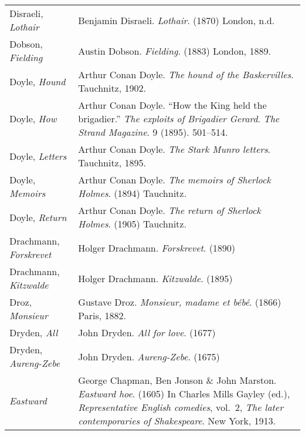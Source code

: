 \begin{longtable}{p{} p{}}
Disraeli, \textit{Lothair} & Benjamin Disraeli. \textit{Lothair}. (1870) London, n.d. \\ %

Dobson, \textit{Fielding} & Austin Dobson. \textit{Fielding}. (1883) London, 1889.  \\ %

Doyle, \textit{Hound} & Arthur Conan Doyle. \textit{The hound of the Baskervilles}. Tauchnitz, 1902. \\
Doyle, \textit{How} & Arthur Conan Doyle. ``How the King held the brigadier.'' \textit{The exploits of Brigadier Gerard}.  \textit{The Strand Magazine}. 9 (1895). 501--514. \\ %
Doyle, \textit{Letters} & Arthur Conan Doyle. \textit{The Stark Munro letters}. Tauchnitz, 1895.  \\
Doyle, \textit{Memoirs} & Arthur Conan Doyle. \textit{The memoirs of Sherlock Holmes}. (1894) Tauchnitz. \\ %
Doyle, \textit{Return} & Arthur Conan Doyle. \textit{The return of Sherlock Holmes}. (1905) Tauchnitz. \\ %

Drachmann, \textit{Forskrevet} & Holger Drachmann. \textit{Forskrevet}. (1890) \\
Drachmann, \textit{Kitzwalde} & Holger Drachmann. \textit{Kitzwalde}. (1895) \\

Droz, \textit{Monsieur} & Gustave Droz. \textit{Monsieur, madame et bébé}. (1866) Paris, 1882.\\

Dryden, \textit{All} & John Dryden. \textit{All for love}. (1677) \\
Dryden, \textit{Aureng-Zebe} & John Dryden. \textit{Aureng-Zebe}. (1675) \\
%

\textit{Eastward} & George Chapman, Ben Jonson \& John Marston. \textit{Eastward hoe}. (1605) In Charles Mills Gayley (ed.), \textit{Representative English comedies}, vol.~2, \textit{The later contemporaries of Shakespeare}. New York, 1913. \\ %


\end{longtable}
